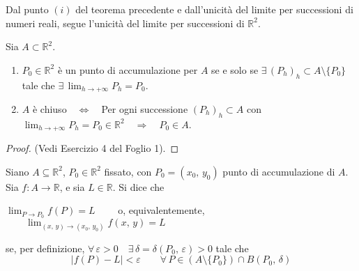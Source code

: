 \begin{obs}
Dal punto $(i)$ del teorema precedente e dall'unicità del limite per successioni di numeri reali, segue l'unicità del limite per successioni di $\mathbb{R}^2$.
\end{obs}

\begin{proposition}
Sia $A \subset \mathbb{R}^2$.
\begin{enumerate}[labelindent=\parindent,leftmargin=*,label=\textnormal{(\roman*)},start=1]
\item $P_0 \in \mathbb{R}^2$ è un punto di accumulazione per $A$ se e solo se $\exists \, (P_h)_h \subset A \setminus \lbrace P_0 \rbrace$ tale che $\exists \, \displaystyle \lim_{h \rightarrow +\infty} P_h = P_0$.
\item $A$ è chiuso$\quad \Longleftrightarrow \quad$Per ogni successione $(P_h)_h \subset A$ con $\displaystyle \lim_{h \rightarrow +\infty} P_h = P_0 \in \mathbb{R}^2 \quad \Rightarrow \quad P_0 \in A$.
\end{enumerate}
\end{proposition}
\begin{proof}
(Vedi Esercizio 4 del Foglio 1).
\end{proof}

\begin{definition}
Siano $A \subseteq \mathbb{R}^2$, $P_0 \in \mathbb{R}^2$ fissato, con $P_0=(x_0,\, y_0)$ punto di accumulazione di $A$. Sia $f : A \longrightarrow \mathbb{R}$, e sia $L \in \mathbb{R}$.
Si dice che
\begin{center}
$\displaystyle \lim_{P \rightarrow P_0} f(P) = L \qquad$
o, equivalentemente,
$\displaystyle \qquad \lim_{(x,\, y) \rightarrow (x_0,\, y_0)} f(x,\, y) = L$
\end{center}
se, per definizione, $\forall \, \varepsilon > 0 \quad \exists \, \delta = \delta(P_0,\, \varepsilon) > 0$ tale che
$$|f(P) - L| < \varepsilon \qquad \forall \, P \in (A \setminus \lbrace P_0 \rbrace) \cap B(P_0,\, \delta)$$
\end{definition}

